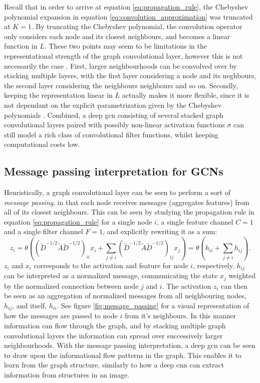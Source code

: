 Recall that in order to arrive at equation \eqref{eq:propagation_rule}, the Chebyshev polynomial expansion in equation \eqref{eq:convolution_approximation} was truncated at $K=1$. By truncating the Chebyshev polynomial, the convolution operator only considers each node and its closest neighbours, and becomes a linear function in $L$. These two points may seem to be limitations in the representational strength of the graph convolutional layer, however this is not necessarily the case \cite{kipf_semi_supervised}. First, larger neighbourhoods can be convolved over by stacking multiple layers, with the first layer considering a node and its neghbours, the second layer considering the neighbours neighbours and so on. Secondly, keeping the representation linear in $L$ actually makes it more flexible, since it is not dependant on the explicit parametrization given by the Chebyshev polynomials \cite{kipf_semi_supervised}. Combined, a deep \acrshort{gcn} consisting of several stacked graph convolutional layers paired with possibly non-linear activation functions $\sigma$ can still model a rich class of convolutional filter functions, whilst keeping computational costs low. 


\subsection{Message passing interpretation for GCNs}
\label{subsec:message_passing}

Heuristically, a graph convolutional layer can be seen to perform a sort of \textit{message passing}, in that each node receives messages (aggregates features) from all of its closest neighbours. This can be seen by studying the propagation rule in equation \eqref{eq:propagation_rule} for a single node $i$, a single feature channel $C=1$ and a single filter channel $F=1$, and explicitly rewriting it as a sum:
\begin{equation}
    z_i = \theta \left(\left(\tilde{D}^{-1/2} \tilde{A} \tilde{D}^{-1/2}\right)_{ii} x_{i} + \sum_{j \neq i} \left(\tilde{D}^{-1/2} \tilde{A} \tilde{D}^{-1/2}\right)_{ij} x_{j} \right) = \theta \left(h_{ii} + \sum_{j \neq i} h_{ij} \right).
\end{equation}
$z_i$ and $x_i$ corresponds to the activation and feature for node $i$, respectively. $h_{ij}$ can be interpreted as a normalized message, communicating the state $x_j$ weighted by the normalized connection between node $j$ and $i$. The activation $z_i$ can then be seen as an aggregation of normalized messages from all neighbouring nodes, $h_{ij}$, and itself, $h_{ii}$. See figure \ref{fig:message_passing} for a visual representation of how the messages are passed to node $i$ from it's neighbours. In this manner information can flow through the graph, and by stacking multiple graph convolutional layers the information can spread over successively larger neighbourhoods. With the message passing interpretation, a deep \acrshort{gcn} can be seen to draw upon the informational flow patterns in the graph. This enables it to learn from the graph structure, similarly to how a deep \acrshort{cnn} can extract information from structures in an image.

